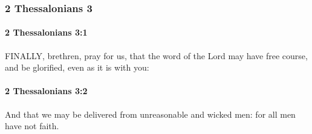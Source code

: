 	\subsubsection{2 Thessalonians 3} %
		\label{2THESSALONIANS-3}
		
		\paragraph{2 Thessalonians 3:1} %
			\label{2THESSALONIANS-3-1}

			FINALLY, brethren, pray for us, that the word of the Lord may have free course, and be glorified, even as it is with you:

			\begin{framed}
			\scriptsize
				\begin{compactdesc}
					\item[SBLG] 
				\end{compactdesc}
			\end{framed}

		\paragraph{2 Thessalonians 3:2} %
			\label{2THESSALONIANS-3-2}

			And that we may be delivered from unreasonable and wicked men: for all men have not faith.

